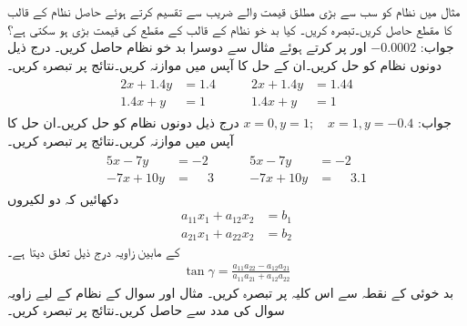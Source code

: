 
\quad
مثال  میں نظام کو سب سے بڑی مطلق قیمت والے  ضریب  سے تقسیم کرتے ہوئے حاصل نظام کے قالب کا مقطع حاصل کریں۔تبصرہ کریں۔ کیا بد خو نظام کے قالب کے مقطع کی قیمت بڑی ہو سکتی ہے؟\\
جواب:\quad
$-0.0002$
\quad
{} اور  پر کرتے ہوئے مثال  سے دوسرا بد خو نظام حاصل کریں۔ 
\quad
درج ذیل دونوں نظام کو حل کریں۔ان کے حل کا آپس میں موازنہ کریں۔نتائج پر تبصرہ کریں۔
\begin{gather*}
\begin{aligned}
2x+1.4y&=1.4\\
1.4x+y&=1
\end{aligned}\quad\quad
\begin{aligned}
2x+1.4y&=1.44\\
1.4x+y&=1
\end{aligned}
\end{gather*}
جواب:\quad
$x=0,y=1;\quad x=1,y=-0.4$
\quad
درج ذیل دونوں نظام کو حل کریں۔ان حل کا آپس میں موازنہ کریں۔نتائج پر تبصرہ کریں۔
\begin{gather*}
\begin{aligned}
5x-7y&=-2\\
-7x+10y&=\phantom{-}3
\end{aligned}\quad\quad
\begin{aligned}
5x-7y&=-2\\
-7x+10y&=\phantom{-}3.1
\end{aligned}
\end{gather*}
\quad
دکھائیں کہ دو لکیروں
\begin{align*}
a_{11}x_1+a_{12}x_2&=b_1\\
a_{21}x_1+a_{22}x_2&=b_2
\end{align*}
کے مابین زاویہ  درج ذیل تعلق دیتا ہے۔
\begin{align*}
\tan \gamma=\frac{a_{11}a_{22}-a_{12}a_{21}}{a_{11}a_{21}+a_{12}a_{22}}
\end{align*}
بد خوئی کے نقطہ سے اس کلیہ پر تبصرہ کریں۔
\quad
مثال  اور سوال  کے نظام کے لیے زاویہ  سوال  کی مدد سے حاصل کریں۔نتائج پر تبصرہ کریں۔
